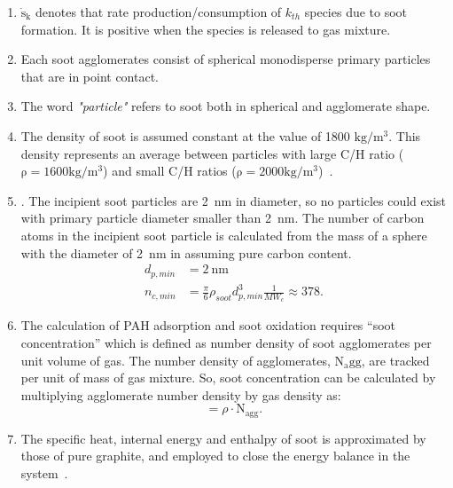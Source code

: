 \begin{enumerate}
\item $\mathrm{\dot{s}_k}$ denotes that rate production/consumption of $k_{th}$ species due to soot formation. It is positive when the species is released to gas mixture.

\item Each soot agglomerates consist of spherical monodisperse primary particles that are in point contact.

\item The word \textit{"particle"} refers to soot both in spherical and agglomerate shape. 

\item The density of soot is assumed constant at the value of 1800 $\mathrm{kg/m^3}$. This density represents an average between particles with large C/H ratio ($\mathrm{\rho=1600 kg/m^3}$) and small C/H ratios ($\mathrm{\rho=2000 kg/m^3}$)~\citep{jensen2007measurement}.

\item. The incipient soot particles are 2~nm in diameter, so no particles could exist with primary particle diameter smaller than 2~nm. The number of carbon atoms in the incipient soot particle is calculated from the mass of a sphere with the diameter of 2~nm in assuming pure carbon content.
\begin{equation}
	\begin{split}
	d_{p,min}&=2~\mathrm{nm} \\
	n_{c,min}& =\frac{\pi}{6}\rho_{soot}d^3_{p,min}\frac{1}{MW_c}\approx378
	\label{eqn:dp_min}.
	\end{split}
\end{equation}
\item The calculation of PAH adsorption and soot oxidation requires “soot concentration” which is defined as number density of soot agglomerates per unit volume of gas. The number density of agglomerates,  $\mathrm{N_agg}$, are tracked per unit of mass of gas mixture. So, soot concentration can be calculated by multiplying agglomerate number density by gas density as:
\begin{equation}
	[\mathrm{soot}] = \rho\cdot \mathrm{N_{agg}}
	\label{eqn:sootconcen}.
\end{equation}

\item The specific heat, internal energy and enthalpy of soot is approximated by those of pure graphite, and employed to close the energy balance in the system~\cite{mcbride1993coefficients}.


\end{enumerate}
